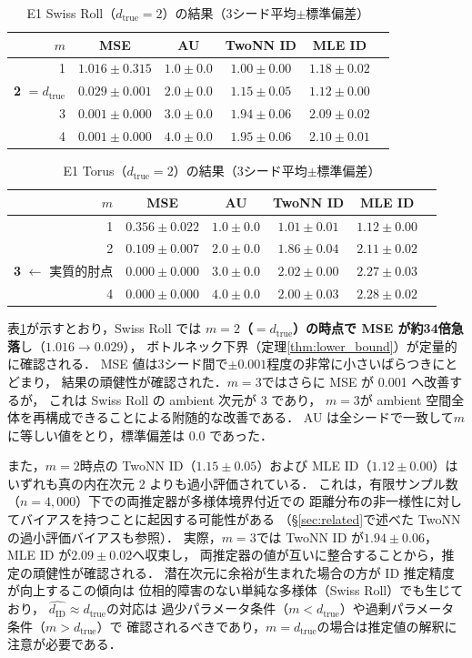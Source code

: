 \documentclass[12pt,a4paper]{jsarticle}
\newcommand{\dID}{d_{\mathrm{ID}}}
\newcommand{\dtrue}{d_{\mathrm{true}}}
\begin{document}
\begin{table}[H]
\centering
\caption{E1 Swiss Roll（$\dtrue = 2$）の結果（3シード平均$\pm$標準偏差）}
\label{tab:e1_swissroll}
\begin{tabular}{rccccc}
\toprule
$m$ & MSE & AU & TwoNN ID & MLE ID \\
\midrule
1 & $1.016\pm0.315$ & $1.0\pm0.0$ & $1.00\pm0.00$ & $1.18\pm0.02$ \\
\textbf{2} $= \dtrue$ & $\boldsymbol{0.029\pm0.001}$ & $2.0\pm0.0$ & $1.15\pm0.05$ & $1.12\pm0.00$ \\
3 & $0.001\pm0.000$ & $3.0\pm0.0$ & $1.94\pm0.06$ & $2.09\pm0.02$ \\
4 & $0.001\pm0.000$ & $4.0\pm0.0$ & $1.95\pm0.06$ & $2.10\pm0.01$ \\
\bottomrule
\end{tabular}
\end{table}

\begin{table}[H]
\centering
\caption{E1 Torus（$\dtrue = 2$）の結果（3シード平均$\pm$標準偏差）}
\label{tab:e1_torus}
\begin{tabular}{rccccc}
\toprule
$m$ & MSE & AU & TwoNN ID & MLE ID \\
\midrule
1 & $0.356\pm0.022$ & $1.0\pm0.0$ & $1.01\pm0.01$ & $1.12\pm0.00$ \\
2 & $0.109\pm0.007$ & $2.0\pm0.0$ & $1.86\pm0.04$ & $2.11\pm0.02$ \\
\textbf{3} $\leftarrow$ 実質的肘点 & $\boldsymbol{0.000\pm0.000}$ & $3.0\pm0.0$ & $2.02\pm0.00$ & $2.27\pm0.03$ \\
4 & $0.000\pm0.000$ & $4.0\pm0.0$ & $2.00\pm0.03$ & $2.28\pm0.02$ \\
\bottomrule
\end{tabular}
\end{table}

表\ref{tab:e1_swissroll}が示すとおり，Swiss Roll では
\textbf{$m = 2$（$= \dtrue$）の時点で MSE が約34倍急落}し（$1.016 \to 0.029$），
ボトルネック下界（定理\ref{thm:lower_bound}）が定量的に確認される．
MSE 値は3シード間で$\pm 0.001$程度の非常に小さいばらつきにとどまり，
結果の頑健性が確認された．$m = 3$ではさらに MSE が 0.001 へ改善するが，
これは Swiss Roll の ambient 次元が 3 であり，
$m = 3$が ambient 空間全体を再構成できることによる附随的な改善である．
AU は全シードで一致して$m$に等しい値をとり，標準偏差は 0.0 であった．

また，$m = 2$時点の TwoNN ID（$1.15\pm0.05$）および MLE ID（$1.12\pm0.00$）は
いずれも真の内在次元 2 よりも過小評価されている．
これは，有限サンプル数（$n = 4{,}000$）下での両推定器が多様体境界付近での
距離分布の非一様性に対してバイアスを持つことに起因する可能性がある\cite{facco2017twonn,levina2005mle}
（§\ref{sec:related}で述べた TwoNN の過小評価バイアスも参照）．
実際，$m = 3$では TwoNN ID が$1.94\pm0.06$，MLE ID が$2.09\pm0.02$へ収束し，
両推定器の値が互いに整合することから，推定の頑健性が確認される．
潜在次元に余裕が生まれた場合の方が ID 推定精度が向上するこの傾向は
位相的障害のない単純な多様体（Swiss Roll）でも生じており，
$\hat{\dID} \approx \dtrue$の対応は
過少パラメータ条件（$m < \dtrue$）や過剰パラメータ条件（$m > \dtrue$）で
確認されるべきであり，$m = \dtrue$の場合は推定値の解釈に注意が必要である．
\end{document}

